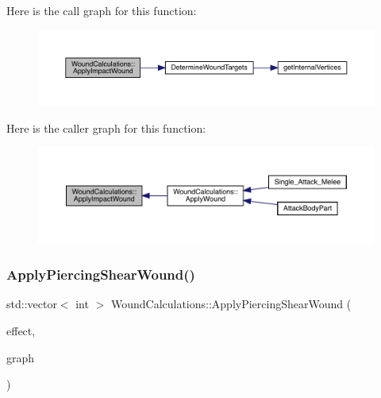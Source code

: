 Here is the call graph for this function\+:\nopagebreak
\begin{figure}[H]
\begin{center}
\leavevmode
\includegraphics[width=350pt]{db/d1e/class_wound_calculations_a645dc9bb6dfc7d5fc20fc8e8b91fd430_cgraph}
\end{center}
\end{figure}
Here is the caller graph for this function\+:
\nopagebreak
\begin{figure}[H]
\begin{center}
\leavevmode
\includegraphics[width=350pt]{db/d1e/class_wound_calculations_a645dc9bb6dfc7d5fc20fc8e8b91fd430_icgraph}
\end{center}
\end{figure}
\mbox{\label{class_wound_calculations_ac763bba5d770b968ab68532b974d878d}} 
\subsubsection{\texorpdfstring{Apply\+Piercing\+Shear\+Wound()}{ApplyPiercingShearWound()}}
{\footnotesize\ttfamily std\+::vector$<$ int $>$ Wound\+Calculations\+::\+Apply\+Piercing\+Shear\+Wound (\begin{DoxyParamCaption}\item[{\mbox{\hyperlink{struct_applied_force_effect}{Applied\+Force\+Effect}} \&}]{effect,  }\item[{\mbox{\hyperlink{_body_graph_8hpp_ab01b157c2e143191570b012d275fbf0d}{Anatomy\+Graph}} \&}]{graph }\end{DoxyParamCaption})}

